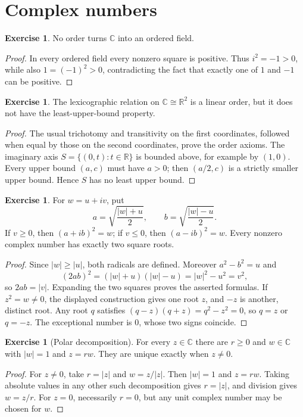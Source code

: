 \documentclass[12pt]{article}
\theoremstyle{definition}
\newtheorem{exercise}[theorem]{Exercise}
\newcommand{\C}{\mathbb C}
\newcommand{\R}{\mathbb R}
\begin{document}
\section{Complex numbers}
\begin{exercise}
No order turns $\C$ into an ordered field.
\end{exercise}
\begin{proof}
In every ordered field every nonzero square is positive.  Thus
$i^2=-1>0$, while also $1=(-1)^2>0$, contradicting the fact that exactly
one of $1$ and $-1$ can be positive.
\end{proof}

\begin{exercise}
The lexicographic relation on $\C\cong\R^2$ is a linear order, but it
does not have the least-upper-bound property.
\end{exercise}
\begin{proof}
The usual trichotomy and transitivity on the first coordinates, followed
when equal by those on the second coordinates, prove the order axioms.
The imaginary axis $S=\{(0,t):t\in\R\}$ is bounded above, for example by
$(1,0)$.  Every upper bound $(a,c)$ must have $a>0$; then
$(a/2,c)$ is a strictly smaller upper bound.  Hence $S$ has no least
upper bound.
\end{proof}

\begin{exercise}
For $w=u+iv$, put
\[
a=\sqrt{\frac{|w|+u}{2}},\qquad b=\sqrt{\frac{|w|-u}{2}}.
\]
If $v\ge0$, then $(a+ib)^2=w$; if $v\le0$, then $(a-ib)^2=w$.
Every nonzero complex number has exactly two square roots.
\end{exercise}
\begin{proof}
Since $|w|\ge|u|$, both radicals are defined.  Moreover
$a^2-b^2=u$ and
\[
 (2ab)^2=(|w|+u)(|w|-u)=|w|^2-u^2=v^2,
\]
so $2ab=|v|$.  Expanding the two squares proves the asserted formulas.
If $z^2=w\ne0$, the displayed construction gives one root $z$, and
$-z$ is another, distinct root.  Any root $q$ satisfies
$(q-z)(q+z)=q^2-z^2=0$, so $q=z$ or $q=-z$.  The exceptional number is
$0$, whose two signs coincide.
\end{proof}

\begin{exercise}[Polar decomposition]
For every $z\in\C$ there are $r\ge0$ and $w\in\C$ with $|w|=1$ and
$z=rw$.  They are unique exactly when $z\ne0$.
\end{exercise}
\begin{proof}
For $z\ne0$, take $r=|z|$ and $w=z/|z|$.  Then $|w|=1$ and $z=rw$.
Taking absolute values in any other such decomposition gives $r=|z|$,
and division gives $w=z/r$.  For $z=0$, necessarily $r=0$, but any unit
complex number may be chosen for $w$.
\end{proof}
\end{document}
